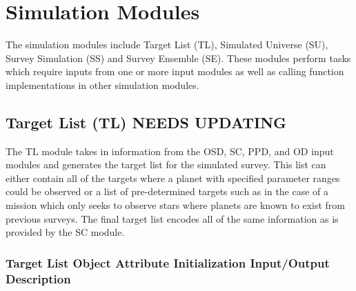 \documentclass[cleanfoot]{asme2ej}
\begin{document}
\section{Simulation Modules}
The simulation modules include Target List (TL), Simulated Universe (SU), Survey Simulation (SS) and Survey Ensemble (SE). These modules perform tasks which require inputs from one or more input modules as well as calling function implementations in other simulation modules.


\subsection{Target List (TL) NEEDS UPDATING}
The TL module takes in information from the OSD, SC, PPD, and OD input modules and generates the target list for the simulated survey.  This list can either contain all of the targets where a planet with specified parameter ranges could be observed or a list of pre-determined targets such as in the case of a mission which only seeks to observe stars where planets are known to exist from previous surveys.  The final target list encodes all of the same information as is provided by the SC module.

\label{sec:targetlist}
\subsubsection{Target List Object Attribute Initialization Input/Output Description}
\end{document}

